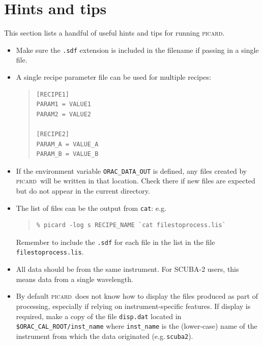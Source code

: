 \documentclass[twoside,11pt]{article}
\renewcommand{\_}{\texttt{\symbol{95}}}
\newenvironment{myquote}{\begin{quote}\begin{small}}{\end{small}\end{quote}}
\newcommand{\picard}{\textsc{picard}}
\begin{document}
\section{Hints and tips\label{se:hints}}

This section lists a handful of useful hints and tips for running
\picard.

\begin{itemize}

\item
Make sure the \verb+.sdf+ extension is included in the filename if
passing in a single file.

\item A single recipe parameter file can be used for multiple recipes:
\begin{myquote}
\begin{verbatim}
[RECIPE1]
PARAM1 = VALUE1
PARAM2 = VALUE2

[RECIPE2]
PARAM_A = VALUE_A
PARAM_B = VALUE_B
\end{verbatim}
\end{myquote}

\item If the environment variable \verb+ORAC_DATA_OUT+ is defined, any
  files created by \picard\ will be written in that location. Check
  there if new files are expected but do not appear in the current
  directory.

\item The list of files can be the output from \texttt{cat}: e.g.\
\begin{myquote}
\begin{verbatim}
% picard -log s RECIPE_NAME `cat filestoprocess.lis`
\end{verbatim}
\end{myquote}
Remember to include the \verb+.sdf+ for each file in the list in the
file \verb+filestoprocess.lis+.

\item All data should be from the same instrument. For SCUBA-2 users,
  this means data from a single wavelength.

\item By default \picard\ does not know how to display the files
  produced as part of processing, especially if relying on
  instrument-specific features. If display is required, make a copy of
  the file \texttt{disp.dat} located in
  \verb+$ORAC_CAL_ROOT/inst_name+ where \verb+inst_name+ is the
  (lower-case) name of the instrument from which the data originated
  (e.g.\,\verb+scuba2+).

\end{itemize}
\end{document}
